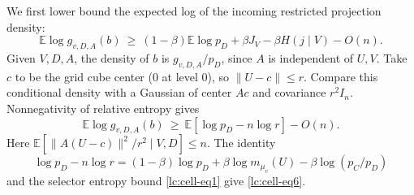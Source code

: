 We first lower bound the expected log of the incoming restricted
projection density:
\begin{equation}\label{lc:cell-eq6}
\mathbb E\log g_{v,D,A}(b)
 \ \ge\ (1-\beta)\mathbb E\log p_D +\beta J_V
       -\beta H(j\mid V)-O(n).
\end{equation}
Given \(V,D,A\), the density of \(b\) is \(g_{v,D,A}/p_D\), since
\(A\) is independent of \(U,V\). Take \(c\) to be the grid cube center
(0 at level 0), so \(\|U-c\|\le r\). Compare this conditional density
with a Gaussian of center \(Ac\) and covariance \(r^2I_n\).
Nonnegativity of relative entropy gives
\[
 \mathbb E\log g_{v,D,A}(b)\ \ge\ \mathbb E[\log p_D-n\log r]-O(n).
\]
Here \(\mathbb E[\|A(U-c)\|^2/r^2\mid V,D]\le n\). The identity
\[
 \log p_D-n\log r
 =(1-\beta)\log p_D+\beta\log m_{\mu_v}(U)
                  -\beta\log(p_C/p_D)
\]
and the selector entropy bound \eqref{lc:cell-eq1} give
\eqref{lc:cell-eq6}.

